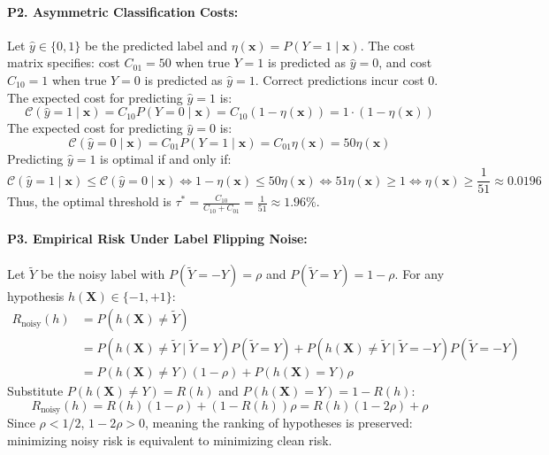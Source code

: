 \paragraph{P2. Asymmetric Classification Costs:}
Let $\hat{y} \in \{0, 1\}$ be the predicted label and $\eta(\mathbf{x}) = P(Y = 1 \mid \mathbf{x})$. The cost matrix specifies:
cost $C_{01} = 50$ when true $Y = 1$ is predicted as $\hat{y} = 0$, and cost $C_{10} = 1$ when true $Y = 0$ is predicted as $\hat{y} = 1$. Correct predictions incur cost $0$.
The expected cost for predicting $\hat{y} = 1$ is:
\begin{equation*}
\mathcal{C}(\hat{y} = 1 \mid \mathbf{x}) = C_{10} P(Y = 0 \mid \mathbf{x}) = C_{10} (1 - \eta(\mathbf{x})) = 1 \cdot (1 - \eta(\mathbf{x}))
\end{equation*}
The expected cost for predicting $\hat{y} = 0$ is:
\begin{equation*}
\mathcal{C}(\hat{y} = 0 \mid \mathbf{x}) = C_{01} P(Y = 1 \mid \mathbf{x}) = C_{01} \eta(\mathbf{x}) = 50 \eta(\mathbf{x})
\end{equation*}
Predicting $\hat{y} = 1$ is optimal if and only if:
\begin{equation*}
\mathcal{C}(\hat{y} = 1 \mid \mathbf{x}) \le \mathcal{C}(\hat{y} = 0 \mid \mathbf{x}) \iff 1 - \eta(\mathbf{x}) \le 50 \eta(\mathbf{x}) \iff 51 \eta(\mathbf{x}) \ge 1 \iff \eta(\mathbf{x}) \ge \frac{1}{51} \approx 0.0196
\end{equation*}
Thus, the optimal threshold is $\tau^* = \frac{C_{10}}{C_{10} + C_{01}} = \frac{1}{51} \approx 1.96\%$.

\paragraph{P3. Empirical Risk Under Label Flipping Noise:}
Let $\tilde{Y}$ be the noisy label with $P(\tilde{Y} = -Y) = \rho$ and $P(\tilde{Y} = Y) = 1 - \rho$.
For any hypothesis $h(\mathbf{X}) \in \{-1, +1\}$:
\begin{align*}
R_{\text{noisy}}(h) &= P(h(\mathbf{X}) \ne \tilde{Y}) \\
&= P(h(\mathbf{X}) \ne \tilde{Y} \mid \tilde{Y} = Y) P(\tilde{Y} = Y) + P(h(\mathbf{X}) \ne \tilde{Y} \mid \tilde{Y} = -Y) P(\tilde{Y} = -Y) \\
&= P(h(\mathbf{X}) \ne Y)(1 - \rho) + P(h(\mathbf{X}) = Y)\rho
\end{align*}
Substitute $P(h(\mathbf{X}) \ne Y) = R(h)$ and $P(h(\mathbf{X}) = Y) = 1 - R(h)$:
\begin{equation*}
R_{\text{noisy}}(h) = R(h)(1 - \rho) + (1 - R(h))\rho = R(h)(1 - 2\rho) + \rho
\end{equation*}
Since $\rho < 1/2$, $1 - 2\rho > 0$, meaning the ranking of hypotheses is preserved: minimizing noisy risk is equivalent to minimizing clean risk.

